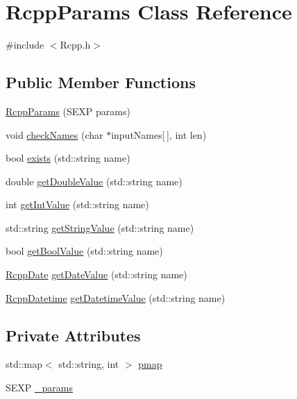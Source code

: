\hypertarget{classRcppParams}{
\section{RcppParams Class Reference}
\label{classRcppParams}
}


{\ttfamily \#include $<$Rcpp.h$>$}\subsection*{Public Member Functions}
\begin{DoxyCompactItemize}
\item 
\hyperlink{classRcppParams_a7315d083ee0d1d0ca00c3aad0175d524}{RcppParams} (SEXP params)
\item 
void \hyperlink{classRcppParams_a1b8feaf39d3ffdf0f6773c44ac53736c}{checkNames} (char $\ast$inputNames\mbox{[}$\,$\mbox{]}, int len)
\item 
bool \hyperlink{classRcppParams_a989141ab2a8800b97d91bfb43420c6bc}{exists} (std::string name)
\item 
double \hyperlink{classRcppParams_aa45f8bc1cd8a64aa9a98e24158407077}{getDoubleValue} (std::string name)
\item 
int \hyperlink{classRcppParams_abb554151641ab12a793f28d3d081973a}{getIntValue} (std::string name)
\item 
std::string \hyperlink{classRcppParams_adc04f4552582eeec09b0806ddd8e2581}{getStringValue} (std::string name)
\item 
bool \hyperlink{classRcppParams_ad818a50a0e269360f3f74c5259dec882}{getBoolValue} (std::string name)
\item 
\hyperlink{classRcppDate}{RcppDate} \hyperlink{classRcppParams_aae20c7ee73aa2f1176837cc9387ad008}{getDateValue} (std::string name)
\item 
\hyperlink{classRcppDatetime}{RcppDatetime} \hyperlink{classRcppParams_aa4bec8bfe32d5079e64dc1c9a8fcf1b9}{getDatetimeValue} (std::string name)
\end{DoxyCompactItemize}
\subsection*{Private Attributes}
\begin{DoxyCompactItemize}
\item 
std::map$<$ std::string, int $>$ \hyperlink{classRcppParams_a399697fc90ba3136c61dd6e20931bd8b}{pmap}
\item 
SEXP \hyperlink{classRcppParams_a3040dda3b32eff66fb73d3ba3874ca5b}{\_\-params}
\end{DoxyCompactItemize}



